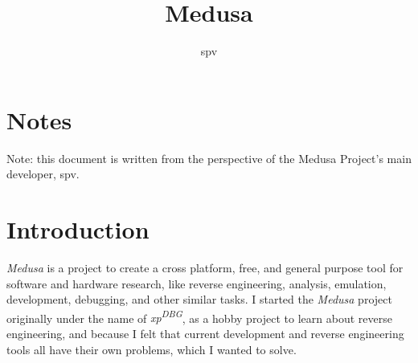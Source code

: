 \documentclass{article}
\title{Medusa}
\author{spv}
\begin{document}
	\maketitle

	\section{Notes}
	Note: this document is written from the perspective of the Medusa Project's
	main developer, spv.

	\section{Introduction}
	\textit{Medusa} is a project to create a cross platform, free, and general
	purpose tool for software and hardware research, like reverse engineering,
	analysis, emulation, development, debugging, and other similar tasks. I
	started the \textit{Medusa} project originally under the name of
	\textit{xp\textsuperscript{DBG}}, as a hobby project to learn about reverse
	engineering, and because I felt that current development and reverse
	engineering tools all have their own problems, which I wanted to solve.
\end{document}
